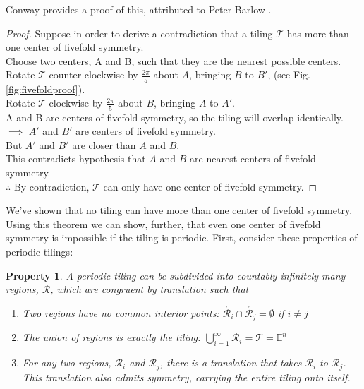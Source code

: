 \documentclass[]{article}
\newtheorem{myprop}{Property}
\begin{document}
Conway provides a proof of this, attributed to Peter Barlow \cite{Gardner1997}.

\begin{proof}
Suppose in order to derive a contradiction that a tiling $\mathcal{T}$ has more than one center of fivefold symmetry.\\
Choose two centers, A and B, such that they are the nearest possible centers. \\
Rotate $\mathcal{T}$ counter-clockwise by $\frac{2\pi}{5}$ about $A$, bringing $B$ to $B'$, (see Fig.\ref{fig:fivefoldproof}).\\
Rotate $\mathcal{T}$ clockwise by $\frac{2\pi}{5}$ about $B$, bringing $A$ to $A'$.\\
A and B are centers of fivefold symmetry, so the tiling will overlap identically.\\
$\implies$ $A'$ and $B'$ are centers of fivefold symmetry.\\
But $A'$ and $B'$ are closer than $A$ and $B$.\\
This contradicts hypothesis that $A$ and $B$ are nearest centers of fivefold symmetry.\\
$\therefore$ By contradiction, $\mathcal{T}$ can only have one center of fivefold symmetry.
\end{proof}

We've shown that no tiling can have more than one center of fivefold symmetry. Using this theorem we can show, further, that even one center of fivefold symmetry is impossible if the tiling is periodic. First, consider these properties of periodic tilings:

\begin{myprop}
A periodic tiling can be subdivided into countably infinitely many regions, $\mathcal{R}$, which are congruent by translation such that
\begin{enumerate}
\item Two regions have no common interior points: $\mathring{\mathcal{R}_i} \cap  \mathring{\mathcal{R}_j}=\emptyset$ if $i\neq j$
\item The union of regions is exactly the tiling: $\bigcup_{i=1}^\infty \mathcal{R}_i = \mathcal{T}=\mathbb{E}^n$
\item For any two regions, $\mathcal{R}_i$ and $\mathcal{R}_j$, there is a translation that takes  $\mathcal{R}_i$ to $\mathcal{R}_j$. This translation also admits symmetry, carrying the entire tiling onto itself. \label{periodprop3}
\end{enumerate}
\label{periodprop}
\end{myprop}
\end{document}
